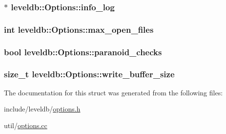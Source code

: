 \hypertarget{structleveldb_1_1_options_af5545cba00b0e9763ad0279a74acc429}{
\subsubsection[{info\-\_\-log}]{$\ast$ leveldb\-::\-Options\-::info\-\_\-log}}\label{structleveldb_1_1_options_af5545cba00b0e9763ad0279a74acc429}
\hypertarget{structleveldb_1_1_options_a25c6ea125fc63342d8fc25b2f7817be4}{
\subsubsection[{max\-\_\-open\-\_\-files}]{\setlength{\rightskip}{0pt plus 5cm}int leveldb\-::\-Options\-::max\-\_\-open\-\_\-files}}\label{structleveldb_1_1_options_a25c6ea125fc63342d8fc25b2f7817be4}
\hypertarget{structleveldb_1_1_options_a4263dcc655493100eecc9daf6737a10b}{
\subsubsection[{paranoid\-\_\-checks}]{\setlength{\rightskip}{0pt plus 5cm}bool leveldb\-::\-Options\-::paranoid\-\_\-checks}}\label{structleveldb_1_1_options_a4263dcc655493100eecc9daf6737a10b}
\hypertarget{structleveldb_1_1_options_a017f1f9558e6b3887434df29a16dac97}{
\subsubsection[{write\-\_\-buffer\-\_\-size}]{\setlength{\rightskip}{0pt plus 5cm}size\-\_\-t leveldb\-::\-Options\-::write\-\_\-buffer\-\_\-size}}\label{structleveldb_1_1_options_a017f1f9558e6b3887434df29a16dac97}


The documentation for this struct was generated from the following files\-:\begin{DoxyCompactItemize}
\item 
include/leveldb/\hyperlink{options_8h}{options.\-h}\item 
util/\hyperlink{options_8cc}{options.\-cc}\end{DoxyCompactItemize}
